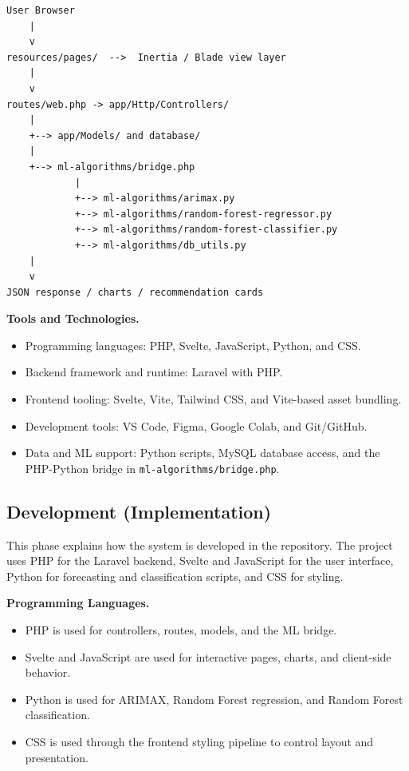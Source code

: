 \documentclass[12pt]{article}
\begin{document}
\vspace*{0.2cm}
\begin{verbatim}
User Browser
    |
    v
resources/pages/  -->  Inertia / Blade view layer
    |
    v
routes/web.php -> app/Http/Controllers/
    |
    +--> app/Models/ and database/
    |
    +--> ml-algorithms/bridge.php
            |
            +--> ml-algorithms/arimax.py
            +--> ml-algorithms/random-forest-regressor.py
            +--> ml-algorithms/random-forest-classifier.py
            +--> ml-algorithms/db_utils.py
    |
    v
JSON response / charts / recommendation cards
\end{verbatim}

\medskip
\noindent\textbf{Tools and Technologies.}
\begin{itemize}
    \item Programming languages: PHP, Svelte, JavaScript, Python, and CSS.
    \item Backend framework and runtime: Laravel with PHP.
    \item Frontend tooling: Svelte, Vite, Tailwind CSS, and Vite-based asset bundling.
    \item Development tools: VS Code, Figma, Google Colab, and Git/GitHub.
    \item Data and ML support: Python scripts, MySQL database access, and the PHP-Python bridge in \texttt{ml-algorithms/bridge.php}.
\end{itemize}

\subsection{Development (Implementation)}

This phase explains how the system is developed in the repository. The project uses PHP for the Laravel backend, Svelte and JavaScript for the user interface, Python for forecasting and classification scripts, and CSS for styling.

\newpage
\medskip
\noindent\textbf{Programming Languages.}
\begin{itemize}
    \item PHP is used for controllers, routes, models, and the ML bridge.
    \item Svelte and JavaScript are used for interactive pages, charts, and client-side behavior.
    \item Python is used for ARIMAX, Random Forest regression, and Random Forest classification.
    \item CSS is used through the frontend styling pipeline to control layout and presentation.
\end{itemize}
\end{document}
